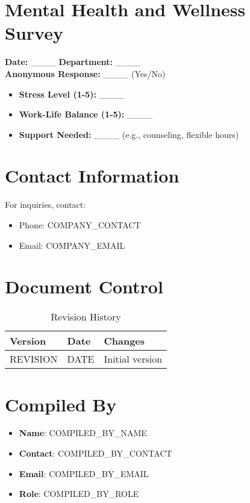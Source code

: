 \documentclass[12pt]{article}
\begin{document}
\section{Mental Health and Wellness Survey}

\textbf{Date:} \_\_\_\_ \textbf{Department:} \_\_\_\_\\
\textbf{Anonymous Response:} \_\_\_\_ (Yes/No)

\begin{itemize}
    \item \textbf{Stress Level (1-5):} \_\_\_\_
    \item \textbf{Work-Life Balance (1-5):} \_\_\_\_
    \item \textbf{Support Needed:} \_\_\_\_ (e.g., counseling, flexible hours)
\end{itemize}

\section{Contact Information}
For inquiries, contact:
\begin{itemize}
    \item Phone: {{COMPANY_CONTACT}}
    \item Email: {{COMPANY_EMAIL}}
\end{itemize}

\section{Document Control}
\begin{table}[h]
    \centering
    \begin{tabular}{p{3cm}p{3cm}p{6cm}}
        \toprule
        \textbf{Version} & \textbf{Date} & \textbf{Changes} \\
        \midrule
        {{REVISION}} & {{DATE}} & Initial version \\
        \bottomrule
    \end{tabular}
    \caption{Revision History}
\end{table}

\section{Compiled By}
\begin{itemize}
    \item \textbf{Name}: {{COMPILED_BY_NAME}}
    \item \textbf{Contact}: {{COMPILED_BY_CONTACT}}
    \item \textbf{Email}: {{COMPILED_BY_EMAIL}}
    \item \textbf{Role}: {{COMPILED_BY_ROLE}}
\end{itemize}
\end{document}
